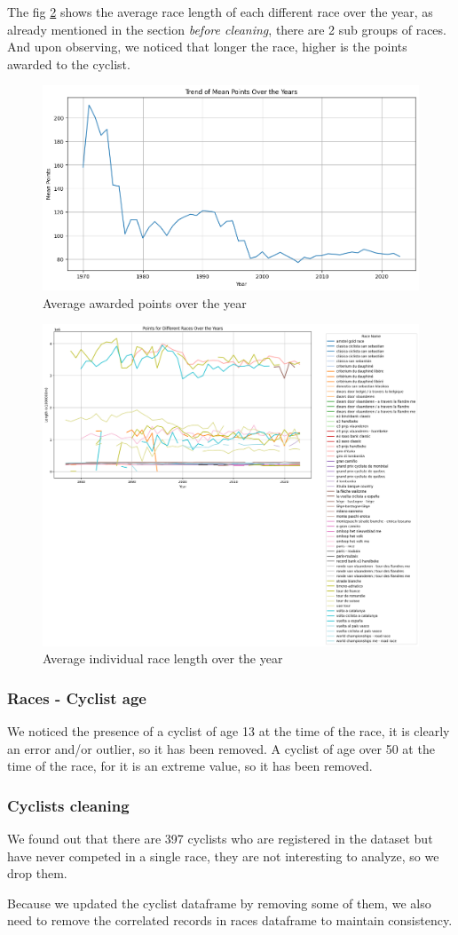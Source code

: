 \documentclass{article}
\begin{document}
The fig \ref{fig:5} shows the average race length of each different race over the year, as already mentioned in the section \emph{before cleaning}, there are 2 sub groups of races. And upon observing, we noticed that longer the race, higher is the points awarded to the cyclist.

\begin{figure}[H]
\centering
\includegraphics[width=0.40\linewidth]{4.png}
\caption{\label{fig:4}Average awarded points over the year}
\end{figure}

\begin{figure}[H]
\centering
\includegraphics[width=0.40\linewidth]{5.png}
\caption{\label{fig:5}Average individual race length over the year}
\end{figure}

\subsubsection{Races - Cyclist age}
We noticed the presence of a cyclist of age 13 at the time of the race, it is clearly an error and/or outlier, so it has been removed. A cyclist of age over 50 at the time of the race, for it is an extreme value, so it has been removed.

\subsubsection{Cyclists cleaning}
We found out that there are 397 cyclists who are registered in the dataset but have never competed in a single race, they are not interesting to analyze, so we drop them.

Because we updated the cyclist dataframe by removing some of them, we also need to remove the correlated records in races dataframe to maintain consistency.
\end{document}
